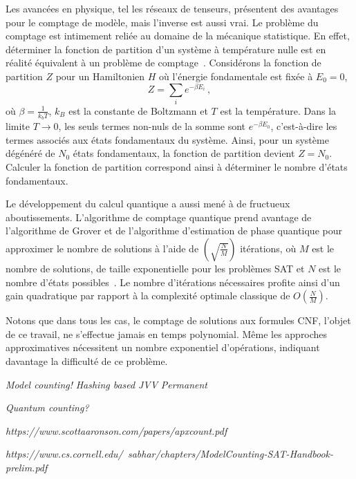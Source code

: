 Les avancées en physique, tel les réseaux de tenseurs, présentent des avantages pour le comptage de modèle, mais l'inverse est aussi vrai. Le problème du comptage est intimement reliée au domaine de la mécanique statistique. En effet, déterminer la fonction de partition d'un système à température nulle est en réalité équivalent à un problème de comptage~\cite{timmeCountingComplexDisordered2009}. Considérons la fonction de partition $Z$ pour un Hamiltonien $H$ où l'énergie fondamentale est fixée à $E_{0} = 0$,
\begin{equation}
    Z = \sum_{i} e^{-\beta E_{i}} \,,
\end{equation}
où $\beta = \frac{1}{k_{b} T}$, $k_{B}$ est la constante de Boltzmann et $T$ est la température. Dans la limite $T \to 0$, les seuls termes non-nuls de la somme sont $e^{-\beta E_{0}}$, c'est-à-dire les termes associés aux états fondamentaux du système. Ainsi, pour un système dégénéré de $N_{0}$ états fondamentaux, la fonction de partition devient $Z = N_{0}$. Calculer la fonction de partition correspond ainsi à déterminer le nombre d'états fondamentaux.

Le développement du calcul quantique a aussi mené à de fructueux aboutissements. L'algorithme de comptage quantique prend avantage de l'algorithme de Grover et de l'algorithme d'estimation de phase quantique pour approximer le nombre de solutions à l'aide de $(\sqrt{\frac{N}{M}})$ itérations, où $M$ est le nombre de solutions, de taille exponentielle pour les problèmes SAT et $N$ est le nombre d'états possibles~\cite{brassardQuantumCounting1998}. Le nombre d'itérations nécessaires profite ainsi d'un gain quadratique par rapport à la complexité optimale classique de $O(\frac{N}{M})$.

Notons que dans tous les cas, le comptage de solutions aux formules CNF, l'objet de ce travail, ne s'effectue jamais en temps polynomial. Même les approches approximatives nécessitent un nombre exponentiel d'opérations, indiquant davantage la difficulté de ce problème.


\textcolor{mydarkred}{\textit{Model counting!}}
\textcolor{mydarkred}{\textit{Hashing based}}
\textcolor{mydarkred}{\textit{JVV}}
\textit{}
\textcolor{mydarkred}{\textit{Permanent}}

\textcolor{mydarkred}{\textit{Quantum counting?}}

\textcolor{mydarkred}{\textit{https://www.scottaaronson.com/papers/apxcount.pdf}}

\textcolor{mydarkred}{\textit{https://www.cs.cornell.edu/~sabhar/chapters/ModelCounting-SAT-Handbook-prelim.pdf}}

